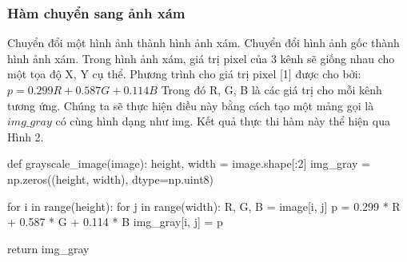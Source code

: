 \documentclass[a4paper]{article}
\begin{document}
\subsubsection{Hàm chuyển sang ảnh xám}
Chuyển đổi một hình ảnh thành hình ảnh xám. Chuyển đổi hình ảnh gốc thành hình ảnh xám. Trong hình ảnh xám, giá trị pixel của 3 kênh sẽ giống nhau cho một tọa độ X, Y cụ thể. Phương trình cho giá trị pixel [1] được cho bởi:
$p = 0.299R + 0.587G + 0.114B$
Trong đó R, G, B là các giá trị cho mỗi kênh tương ứng. Chúng ta sẽ thực hiện điều này bằng cách tạo một mảng gọi là $img\_gray$ có cùng hình dạng như img. Kết quả thực thi hàm này thể hiện qua Hình 2.
\begin{python}
def grayscale_image(image):
    height, width = image.shape[:2]
    img_gray = np.zeros((height, width), dtype=np.uint8)
    
    for i in range(height):
        for j in range(width):
            R, G, B = image[i, j]
            p = 0.299 * R + 0.587 * G + 0.114 * B
            img_gray[i, j] = p
    
    return img_gray
\end{python}
\end{document}
